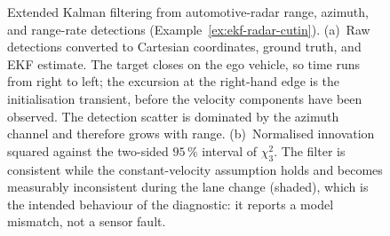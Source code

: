 \begin{figure}[!t]
{
}
\caption{Extended Kalman filtering from automotive-radar
range, azimuth, and range-rate detections (Example~\ref{ex:ekf-radar-cutin}).
(a)~Raw detections converted to Cartesian coordinates, ground truth, and EKF
estimate. The target closes on the ego vehicle, so time runs from right to left;
the excursion at the right-hand edge is the initialisation transient, before the
velocity components have been observed. The detection scatter is dominated by
the azimuth channel and therefore grows with range. (b)~Normalised innovation
squared against the two-sided $95\,\%$ interval of $\chi^{2}_{3}$. The filter is
consistent while the constant-velocity assumption holds and becomes measurably
inconsistent during the lane change (shaded), which is the intended behaviour of
the diagnostic: it reports a model mismatch, not a sensor fault.}
\label{fig:ekf-radar-cutin}
\end{figure}

